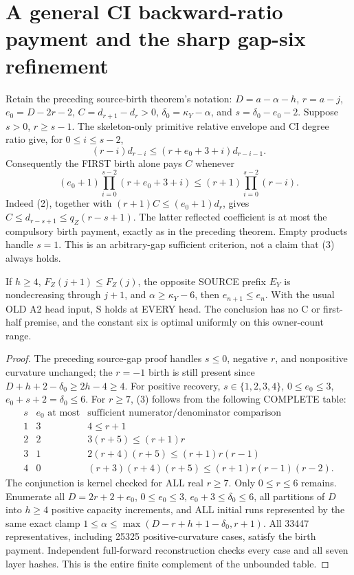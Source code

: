 \section{A general CI backward-ratio payment and the sharp gap-six refinement}
Retain the preceding source-birth theorem's notation:
$D=a-\alpha-h$, $r=a-j$, $e_0=D-2r-2$, $C=d_{r+1}-d_r>0$,
$\delta_0=\kappa_Y-\alpha$, and $s=\delta_0-e_0-2$.
Suppose $s>0$, $r\ge s-1$.
The skeleton-only primitive relative envelope and CI degree ratio
give, for $0\le i\le s-2$,
\[
              (r-i)d_{r-i}\le(r+e_0+3+i)d_{r-i-1}.     \tag{2}
\]
Consequently the FIRST birth alone pays $C$ whenever
\[
 (e_0+1)\prod_{i=0}^{s-2}(r+e_0+3+i)
       \le(r+1)\prod_{i=0}^{s-2}(r-i).                \tag{3}
\]
Indeed (2), together with $(r+1)C\le(e_0+1)d_r$,
gives $C\le d_{r-s+1}\le q_Z(r-s+1)$.
The latter reflected coefficient is at most the compulsory
birth payment, exactly as in the preceding theorem.
Empty products handle $s=1$. This is an arbitrary-gap sufficient
criterion, not a claim that (3) always holds.

\begin{theorem}
If $h\ge4$, $F_Z(j+1)\le F_Z(j)$, the opposite SOURCE prefix
$E_Y$ is nondecreasing through $j+1$, and
$\alpha\ge\kappa_Y-6$, then $e_{n+1}\le e_n$.
With the usual OLD A2 head input, S holds at EVERY head.
The conclusion has no C or first-half premise, and the constant
six is optimal uniformly on this owner-count range.
\end{theorem}
\begin{proof}
The preceding source-gap proof handles $s\le0$, negative $r$,
and nonpositive curvature unchanged; the $r=-1$ birth is still
present since $D+h+2-\delta_0\ge2h-4\ge4$.
For positive recovery, $s\in\{1,2,3,4\}$,
$0\le e_0\le3$, $e_0+s+2=\delta_0\le6$.
For $r\ge7$, (3) follows from the following COMPLETE table:
\[
\begin{array}{c|c|l}
s& e_0\text{ at most}&\text{sufficient numerator/denominator comparison}\\\hline
1&3&4\le r+1\\
2&2&3(r+5)\le(r+1)r\\
3&1&2(r+4)(r+5)\le(r+1)r(r-1)\\
4&0&(r+3)(r+4)(r+5)\le(r+1)r(r-1)(r-2).
\end{array}
\]
The conjunction is kernel checked for ALL real $r\ge7$.
Only $0\le r\le6$ remains. Enumerate all
$D=2r+2+e_0$, $0\le e_0\le3$,
$e_0+3\le\delta_0\le6$, all partitions of $D$ into $h\ge4$
positive capacity increments, and ALL initial runs represented
by the same exact clamp $1\le\alpha\le\max(D-r+h+1-\delta_0,r+1)$.
All 33447 representatives, including 25325 positive-curvature
cases, satisfy the birth payment. Independent full-forward
reconstruction checks every case and all seven layer hashes.
This is the entire finite complement of the unbounded table.
\end{proof}

